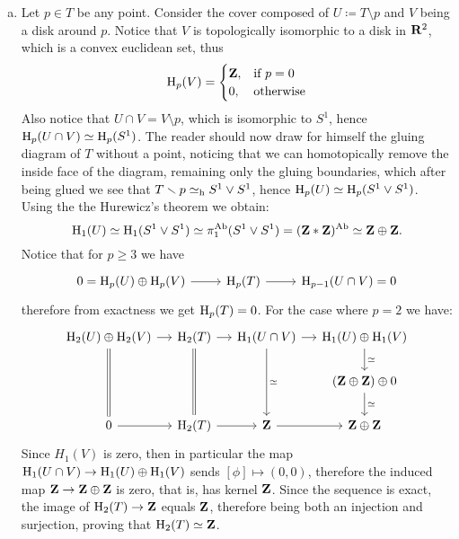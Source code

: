\begin{example}[Torus]
\begin{enumerate}[(a)]
\item Let \(p \in T\) be any point. Consider the cover composed of
  \(U \coloneq T \setminus p\) and \(V\) being a disk around \(p\). Notice that
  \(V\) is topologically isomorphic to a disk in \(\mathbf{R}^2\), which is a convex
  euclidean set, thus
  \[
  \operatorname{H}_p(V) =
  \begin{cases}
    \mathbf{Z}, &\text{if } p = 0 \\
    0,  &\text{otherwise}
  \end{cases}
  \]
  Also notice that \(U \cap V = V \setminus p\), which is isomorphic to \(S^1\), hence
  \(\operatorname{H}_p(U \cap V) \simeq \operatorname{H}_p(S^1)\). The reader should now draw for himself
  the gluing diagram of \(T\) without a point, noticing that we can
  homotopically remove the inside face of the diagram, remaining only the gluing
  boundaries, which after being glued we see that
  \(T \smallsetminus p \simeq_{\text{h}} S^1 \vee S^1\), hence
  \(\operatorname{H}_p(U) \simeq \operatorname{H}_p(S^1 \vee S^1)\). Using the the Hurewicz's theorem we
  obtain:
  \[
  \operatorname{H}_1(U)
  \simeq \operatorname{H}_1(S^1 \vee S^1)
  \simeq \pi_1^{\text{Ab}}(S^1 \vee S^1)
  = (\mathbf{Z} * \mathbf{Z})^{\text{Ab}}
  \simeq \mathbf{Z} \oplus \mathbf{Z}.
  \]
  Notice that for \(p \geq 3\) we have
  \[
  \begin{tikzcd}
  0 = \Hmlg_p(U) \oplus \Hmlg_p(V) \ar[r]
  &\Hmlg_p(T) \ar[r]
  &\Hmlg_{p-1}(U \cap V) = 0
  \end{tikzcd}
  \]
  therefore from exactness we get \(\operatorname{H}_p(T) = 0\). For the case where
  \(p = 2\) we have:
  \[
  \begin{tikzcd}[column sep=small]
  \Hmlg_2(U) \oplus \Hmlg_2(V)
  \ar[r] \ar[dd, equals]
  &\Hmlg_2(T)
  \ar[r] \ar[dd, equals]
  &\Hmlg_1(U \cap V)
  \ar[r] \ar[dd, "\dis"]
  &\Hmlg_1(U) \oplus \Hmlg_1(V)
  \ar[d, "\dis"]
  \\
  &&
  &(\Z \oplus \Z) \oplus 0
  \ar[d, "\dis"]
  \\
  0
  \ar[r]
  &\Hmlg_2(T)
  \ar[r]
  &\Z
  \ar[r]
  &\Z \oplus \Z
  \end{tikzcd}
  \]
  Since \(H_1(V)\) is zero, then in particular the map
  \(\operatorname{H}_1(U \cap V) \to \operatorname{H}_1(U) \oplus \operatorname{H}_1(V)\) sends
  \([\phi] \mapsto (0, 0)\), therefore the induced map \(\mathbf{Z} \to \mathbf{Z} \oplus \mathbf{Z}\) is zero, that is,
  has kernel \(\mathbf{Z}\). Since the sequence is exact, the image of
  \(\operatorname{H}_2(T) \to \mathbf{Z}\) equals \(\mathbf{Z}\), therefore being both an injection and
  surjection, proving that \(\operatorname{H}_2(T) \simeq \mathbf{Z}\).


\end{enumerate}
\end{example}
